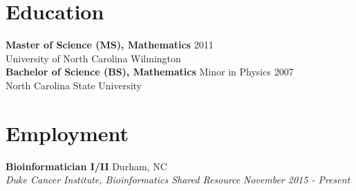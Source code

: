 \documentclass[10pt]{article}
\begin{document}

\section*{Education}

{\bf Master of Science (MS), Mathematics} \hfill 2011\\
University of North Carolina Wilmington
\vspace{5pt}\\
\noindent
{\bf Bachelor of Science (BS), Mathematics} Minor in Physics \hfill 2007\\
North Carolina State University


\section*{Employment}

\noindent
{\bf Bioinformatician I/II} \hfill Durham, NC\\
{\it Duke Cancer Institute, Bioinformatics Shared Resource} \hfill {\it November 2015 - Present}
\end{document}
